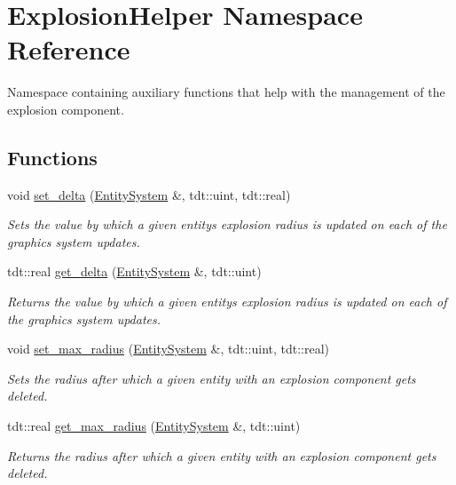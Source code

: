 \hypertarget{namespace_explosion_helper}{}\section{Explosion\+Helper Namespace Reference}
\label{namespace_explosion_helper}


Namespace containing auxiliary functions that help with the management of the explosion component.  


\subsection*{Functions}
\begin{DoxyCompactItemize}
\item 
void \hyperlink{namespace_explosion_helper_a9465bc06d77cbfd8e02ec43b529fcd17}{set\+\_\+delta} (\hyperlink{class_entity_system}{Entity\+System} \&, tdt\+::uint, tdt\+::real)
\begin{DoxyCompactList}\small\item\em Sets the value by which a given entity\textquotesingle{}s explosion radius is updated on each of the graphics system updates. \end{DoxyCompactList}\item 
tdt\+::real \hyperlink{namespace_explosion_helper_a01c6c95060ddffb996a633febf923863}{get\+\_\+delta} (\hyperlink{class_entity_system}{Entity\+System} \&, tdt\+::uint)
\begin{DoxyCompactList}\small\item\em Returns the value by which a given entity\textquotesingle{}s explosion radius is updated on each of the graphics system updates. \end{DoxyCompactList}\item 
void \hyperlink{namespace_explosion_helper_a9b10ea8b47e51eb54adbf0d5692e823b}{set\+\_\+max\+\_\+radius} (\hyperlink{class_entity_system}{Entity\+System} \&, tdt\+::uint, tdt\+::real)
\begin{DoxyCompactList}\small\item\em Sets the radius after which a given entity with an explosion component gets deleted. \end{DoxyCompactList}\item 
tdt\+::real \hyperlink{namespace_explosion_helper_ac32e849c583c83b96ac45ec3e3316452}{get\+\_\+max\+\_\+radius} (\hyperlink{class_entity_system}{Entity\+System} \&, tdt\+::uint)
\begin{DoxyCompactList}\small\item\em Returns the radius after which a given entity with an explosion component gets deleted. \end{DoxyCompactList}\item 

\end{DoxyCompactItemize}
